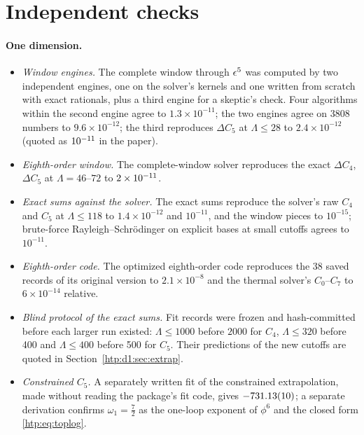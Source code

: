 \section{Independent checks}\label{htp:sec:checks}

\paragraph{One dimension.}
\begin{itemize}
\item \emph{Window engines.} The complete window through $\epsilon^5$ was computed by two independent engines, one on the
 solver's kernels and one written from scratch with exact rationals, plus a third engine for a skeptic's check. Four
 algorithms within the second engine agree to $1.3\times10^{-11}$; the two engines agree on 3808 numbers to
 $9.6\times10^{-12}$; the third reproduces $\Delta C_5$ at $\Lambda\le28$ to $2.4\times10^{-12}$
 (quoted as $10^{-11}$ in the paper).
\item \emph{Eighth-order window.} The complete-window solver reproduces the exact $\Delta C_4$, $\Delta C_5$ at
 $\Lambda=46$--$72$ to $2\times10^{-11}$.
\item \emph{Exact sums against the solver.} The exact sums reproduce the solver's raw $C_4$ and $C_5$ at
 $\Lambda\le118$ to $1.4\times10^{-12}$ and $10^{-11}$, and the window pieces to $10^{-15}$; brute-force
 Rayleigh--Schr\"odinger on explicit bases at small cutoffs agrees to $10^{-11}$.
\item \emph{Eighth-order code.} The optimized eighth-order code reproduces the 38 saved records of its original
 version to $2.1\times10^{-8}$ and the thermal solver's $C_0$--$C_7$ to $6\times10^{-14}$ relative.
\item \emph{Blind protocol of the exact sums.} Fit records were frozen and hash-committed before each larger run
 existed: $\Lambda\le1000$ before $2000$ for $C_4$, $\Lambda\le320$ before 400 and $\Lambda\le400$ before 500 for $C_5$.
 Their predictions of the new cutoffs are quoted in Section~\ref{htp:d1:sec:extrap}.
\item \emph{Constrained $C_5$.} A separately written fit of the constrained extrapolation, made without reading the
 package's fit code, gives $-731.13(10)$; a separate derivation confirms $\omega_1=\tfrac72$ as the one-loop
 exponent of $\phi^6$ and the closed form \eqref{htp:eq:toplog}.
\end{itemize}
